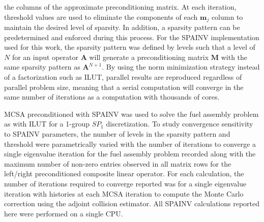 the columns of the approximate preconditioning matrix. At each
iteration, threshold values are used to eliminate the components of
each $\mathbf{m}_j$ column to maintain the desired level of
sparsity. In addition, a sparsity pattern can be predetermined and
enforced during this process. For the SPAINV implementation used for
this work, the sparsity pattern was defined by levels such that a
level of $N$ for an input operator $\mathbf{A}$ will generate a
preconditioning matrix $\mathbf{M}$ with the same sparsity pattern as
$\mathbf{A}^{N+1}$. By using the norm minimization strategy instead of
a factorization such as ILUT, parallel results are reproduced
regardless of parallel problem size, meaning that a serial computation
will converge in the same number of iterations as a computation with
thousands of cores.

MCSA preconditioned with SPAINV was used to solve the fuel assembly
problem as with ILUT for a 1-group $SP_1$ discretization. To study
convergence sensitivity to SPAINV parameters, the number of levels in
the sparsity pattern and threshold were parametrically varied with the
number of iterations to converge a single eigenvalue iteration for the
fuel assembly problem recorded along with the maximum number of
non-zero entries observed in all matrix rows for the left/right
preconditioned composite linear operator. For each calculation, the
number of iterations required to converge reported was for a single
eigenvalue iteration with  histories at each MCSA iteration
to compute the Monte Carlo correction using the adjoint collision
estimator. All SPAINV calculations reported here were performed on a
single CPU.


